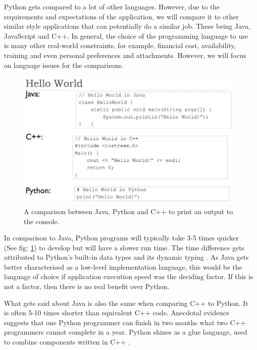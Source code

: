 	Python gets compared to a lot of other languages. However, due to the requirements and expectations of the application, we will compare it to other similar style applications that can potentially do a similar job. These being Java, JavaScript and C++. In general, the choice of the programming language to use is many other real-world constraints, for example, financial cost, availability, training and even personal preferences and attachments. However, we will focus on language issues for the comparisons.
	
	\begin{figure}[t]
		\includegraphics[width=15cm]{graphics/python_vs_java_vs_c++.jpg}
		\caption{A comparison between Java, Python and C++ to print an output to the console. \cite{py_ja_c++}}
		\label{fig:py_java_c++}
	\end{figure}
	
	In comparison to Java, Python programs will typically take 3-5 times quicker (See fig: \ref{fig:py_java_c++}) to develop but will have a slower run time. The time difference gets attributed to Python's built-in data types and its dynamic typing \cite{python_comparison}. As Java gets better characterised as a low-level implementation language, this would be the language of choice if application execution speed was the deciding factor. If this is not a factor, then there is no real benefit over Python.
	
	What gets said about Java is also the same when comparing C++ to Python. It is often 5-10 times shorter than equivalent C++ code. Anecdotal evidence suggests that one Python programmer can finish in two months what two C++ programmers cannot complete in a year. Python shines as a glue language, used to combine components written in C++ \cite{python_comparison}.
	
